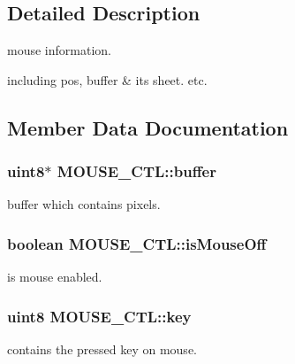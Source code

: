 \subsection{Detailed Description}
mouse information. 

including pos, buffer \& its sheet. etc. 

\subsection{Member Data Documentation}
\hypertarget{struct_m_o_u_s_e___c_t_l_aa66808aaae9beee8ea274abf02c85124}{}
\subsubsection[{buffer}]{\setlength{\rightskip}{0pt plus 5cm}uint8$\ast$ M\+O\+U\+S\+E\+\_\+\+C\+T\+L\+::buffer}\label{struct_m_o_u_s_e___c_t_l_aa66808aaae9beee8ea274abf02c85124}


buffer which contains pixels. 

\hypertarget{struct_m_o_u_s_e___c_t_l_a50ef4375066f58c21f75787b603805fb}{}
\subsubsection[{is\+Mouse\+Off}]{\setlength{\rightskip}{0pt plus 5cm}boolean M\+O\+U\+S\+E\+\_\+\+C\+T\+L\+::is\+Mouse\+Off}\label{struct_m_o_u_s_e___c_t_l_a50ef4375066f58c21f75787b603805fb}


is mouse enabled. 

\hypertarget{struct_m_o_u_s_e___c_t_l_ade3f3716166e203684737f31cff4a753}{}
\subsubsection[{key}]{\setlength{\rightskip}{0pt plus 5cm}uint8 M\+O\+U\+S\+E\+\_\+\+C\+T\+L\+::key}\label{struct_m_o_u_s_e___c_t_l_ade3f3716166e203684737f31cff4a753}


contains the pressed key on mouse. 

